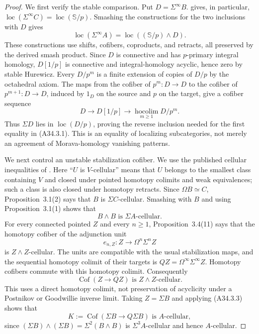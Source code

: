 \begin{proof}
We first verify the stable comparison.  Put $D=\Sigma^\infty B$.
\citet[Theorem~1.5]{ALevy} gives, in particular,
$\operatorname{loc}(\Sigma^\infty C)
 =\operatorname{loc}(\mathbb S/p)$.
Smashing the constructions for the two inclusions with $D$ gives
\[
 \operatorname{loc}(\Sigma^\infty A)
   =\operatorname{loc}((\mathbb S/p)\wedge D).
\]
These constructions use shifts, cofibers, coproducts, and retracts,
all preserved by the derived smash product.  Since $D$ is connective
and has $p$-primary integral homology, $D[1/p]$ is connective and
integral-homology acyclic, hence zero by stable Hurewicz.  Every
$D/p^m$ is a finite extension of copies of $D/p$ by the octahedral
axiom.  The maps from the cofiber of $p^m:D\to D$ to the cofiber of
$p^{m+1}:D\to D$, induced by $1_D$ on the source and $p$ on the
target, give a cofiber sequence
\[
 D\longrightarrow D[1/p]
   \longrightarrow\operatorname*{hocolim}_{m\geq1}D/p^m.
\]
Thus $\Sigma D$ lies in $\operatorname{loc}(D/p)$, proving the
reverse inclusion needed for the first equality in
\textup{(A34.3.1)}.  This is an equality of localizing subcategories,
not merely an agreement of Morava-homology vanishing patterns.

We next control an unstable stabilization cofiber.  We use the
published cellular inequalities of
\citet[Propositions~3.1(1),(2) and~3.4(11)]{A4CFFS2015}.
Here ``$U$ is $V$-cellular'' means that $U$ belongs to the smallest
class containing $V$ and closed under pointed homotopy colimits and
weak equivalences; such a class is also closed under homotopy
retracts.  Since $\Omega B\simeq C$, Proposition~3.1(2) says that
$B$ is $\Sigma C$-cellular.  Smashing with $B$ and using
Proposition~3.1(1) shows that
\[
             B\wedge B\text{ is }\Sigma A\text{-cellular}.
 \tag{A34.3.3}
\]
For every connected pointed $Z$ and every $n\geq1$,
Proposition~3.4(11) says that the homotopy cofiber of the adjunction
unit
\[
          e_{n,Z}:Z\longrightarrow\Omega^n\Sigma^n Z
\]
is $Z\wedge Z$-cellular.  The units are compatible with the usual
stabilization maps, and the sequential homotopy colimit of their
targets is $QZ=\Omega^\infty\Sigma^\infty Z$.  Homotopy cofibers
commute with this homotopy colimit.  Consequently
\[
       \operatorname{Cof}(Z\longrightarrow QZ)
          \text{ is }Z\wedge Z\text{-cellular}.
 \tag{A34.3.4}
\]
This uses a direct homotopy colimit, not preservation of acyclicity
under a Postnikov or Goodwillie inverse limit.  Taking $Z=\Sigma B$
and applying \textup{(A34.3.3)} shows that
\[
 K:=\operatorname{Cof}(\Sigma B\longrightarrow Q\Sigma B)
       \text{ is }A\text{-cellular},
 \tag{A34.3.5}
\]
since $(\Sigma B)\wedge(\Sigma B)=\Sigma^2(B\wedge B)$ is
$\Sigma^3A$-cellular and hence $A$-cellular.


\end{proof}
